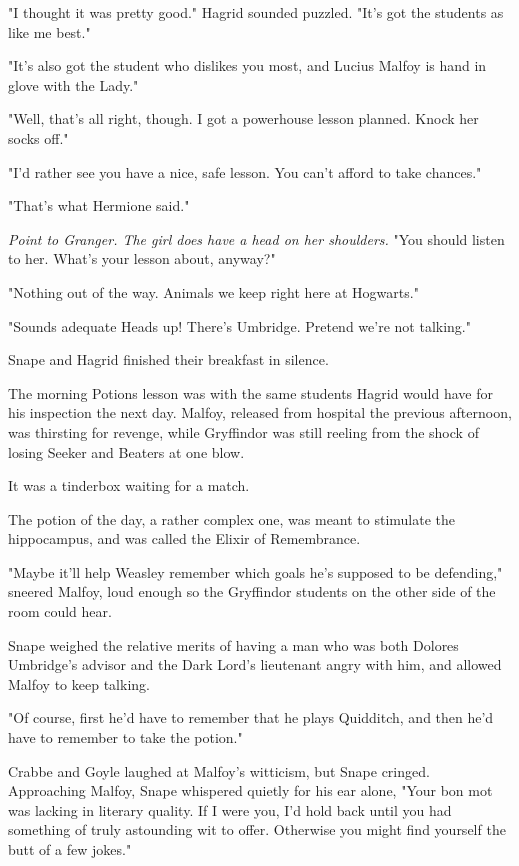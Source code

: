 "I thought it was pretty good." Hagrid sounded puzzled. "It's got the students as like me best."

"It's also got the student who dislikes you most, and Lucius Malfoy is hand in glove with the Lady."

"Well, that's all right, though. I got a powerhouse lesson planned. Knock her socks off."

"I'd rather see you have a nice, safe lesson. You can't afford to take chances."

"That's what Hermione said."

\emph{Point to Granger. The girl does have a head on her shoulders.} "You should listen to her. What's your lesson about, anyway?"

"Nothing out of the way. Animals we keep right here at Hogwarts."

"Sounds adequate{\el} Heads up! There's Umbridge. Pretend we're not talking."

Snape and Hagrid finished their breakfast in silence.

The morning Potions lesson was with the same students Hagrid would have for his inspection the next day. Malfoy, released from hospital the previous afternoon, was thirsting for revenge, while Gryffindor was still reeling from the shock of losing Seeker and Beaters at one blow.

It was a tinderbox waiting for a match.

The potion of the day, a rather complex one, was meant to stimulate the hippocampus, and was called the Elixir of Remembrance.

"Maybe it'll help Weasley remember which goals he's supposed to be defending," sneered Malfoy, loud enough so the Gryffindor students on the other side of the room could hear.

Snape weighed the relative merits of having a man who was both Dolores Umbridge's advisor and the Dark Lord's lieutenant angry with him, and allowed Malfoy to keep talking.

"Of course, first he'd have to remember that he plays Quidditch, and then he'd have to remember to take the potion."

Crabbe and Goyle laughed at Malfoy's witticism, but Snape cringed. Approaching Malfoy, Snape whispered quietly for his ear alone, "Your bon mot was lacking in literary quality. If I were you, I'd hold back until you had something of truly astounding wit to offer. Otherwise you might find yourself the butt of a few jokes."

